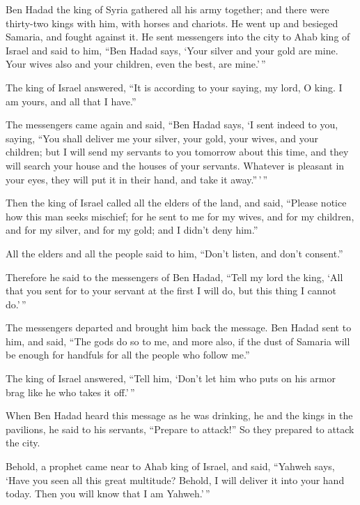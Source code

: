  Ben Hadad the king of Syria gathered all his army together;
and there were thirty-two kings with him, with horses and chariots. He
went up and besieged Samaria, and fought against it.  He
sent messengers into the city to Ahab king of Israel and said to him,
``Ben Hadad says,  `Your silver and your gold are mine. Your
wives also and your children, even the best, are mine.'\,''

 The king of Israel answered, ``It is according to your
saying, my lord, O king. I am yours, and all that I have.''

 The messengers came again and said, ``Ben Hadad says, `I
sent indeed to you, saying, ``You shall deliver me your silver, your
gold, your wives, and your children;  but I will send my
servants to you tomorrow about this time, and they will search your
house and the houses of your servants. Whatever is pleasant in your
eyes, they will put it in their hand, and take it away.''\,'\,''

 Then the king of Israel called all the elders of the land,
and said, ``Please notice how this man seeks mischief; for he sent to me
for my wives, and for my children, and for my silver, and for my gold;
and I didn't deny him.''

 All the elders and all the people said to him, ``Don't
listen, and don't consent.''

 Therefore he said to the messengers of Ben Hadad, ``Tell my
lord the king, `All that you sent for to your servant at the first I
will do, but this thing I cannot do.'\,''

The messengers departed and brought him back the message. 
Ben Hadad sent to him, and said, ``The gods do so to me, and more also,
if the dust of Samaria will be enough for handfuls for all the people
who follow me.''

 The king of Israel answered, ``Tell him, `Don't let him
who puts on his armor brag like he who takes it off.'\,''

 When Ben Hadad heard this message as he was drinking, he
and the kings in the pavilions, he said to his servants, ``Prepare to
attack!'' So they prepared to attack the city.

 Behold, a prophet came near to Ahab king of Israel, and
said, ``Yahweh says, `Have you seen all this great multitude? Behold, I
will deliver it into your hand today. Then you will know that I am
Yahweh.'\,''

